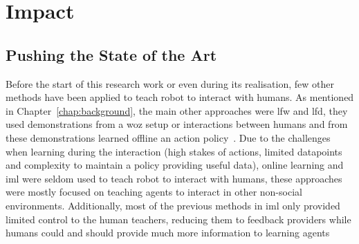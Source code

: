
\section{Impact} \label{sec:disc_impact}

\subsection{Pushing the State of the Art}

Before the start of this research work or even during its realisation, few other methods have been applied to teach robot to interact with humans. As mentioned in Chapter~\ref{chap:background}, the main other approaches were \gls{lfw} and \gls{lfd}, they used demonstrations from a \gls{woz} setup or interactions between humans and from these demonstrations learned offline an action policy~\citep{knox2014learning,liu2014train,sequeira2016discovering}. Due to the challenges when learning during the interaction (high stakes of actions, limited datapoints and complexity to maintain a policy providing useful data), online learning and \gls{iml} were seldom used to teach robot to interact with humans, these approaches were mostly focused on teaching agents to interact in other non-social environments. Additionally, most of the previous methods in \gls{iml} only provided limited control to the human teachers, reducing them to feedback providers while humans could and should provide much more information to learning agents~\citep{amershi2014power}
	
